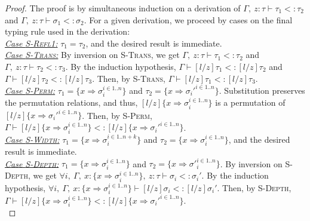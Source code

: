 \begin{proof} The proof is by simultaneous induction on a derivation of \mbox{$\Gamma,~z : \tau \vdash \tau_1 <:  \tau_2$} and \linebreak
    \mbox{$\Gamma,~z : \tau \vdash \sigma_1 <: \sigma_2$}. For a given derivation, we proceed by cases on the final typing rule used in the derivation:\\

\noindent\underline{\textit{Case \textsc{S-Refl1}:}} \mbox{$\tau_1 = \tau_2$}, and the desired result is immediate.\\

\noindent\underline{\textit{Case \textsc{S-Trans}:}} By inversion on \textsc{S-Trans}, we get \mbox{$\Gamma,~z : \tau \vdash \tau_1 <: \tau_2$} and \mbox{$\Gamma,~z : \tau \vdash \tau_2 <: \tau_3$}. By the induction hypothesis, \mbox{$\Gamma \vdash [l/z]\tau_1 <: [l/z]\tau_2$} and \mbox{$\Gamma \vdash [l/z]\tau_2 <: [l/z]\tau_3$}. Then, by\linebreak
\mbox{\textsc{S-Trans}}, \mbox{$\Gamma \vdash [l/z]\tau_1 <: [l/z]\tau_3$}.\\

\noindent\underline{\textit{Case \textsc{S-Perm}:}} \mbox{$\tau_1 = \{ x \Rightarrow \sigma_i^{i \in 1..n} \}$} and \mbox{$\tau_2 = \{ x \Rightarrow \sigma_i'^{i \in 1..n} \}$}. Substitution preserves the permutation relations, and thus, \mbox{$[l/z]\{ x \Rightarrow \sigma_i^{i \in 1..n} \}$} is a permutation of \mbox{$[l/z]\{ x \Rightarrow \sigma_i'^{i \in 1..n} \}$}. Then, by \textsc{S-Perm}, \mbox{$\Gamma \vdash [l/z]\{ x \Rightarrow \sigma_i^{i \in 1..n} \} <: [l/z]\{ x \Rightarrow \sigma_i'^{i \in 1..n} \}$}.\\

\noindent\underline{\textit{Case \textsc{S-Width}:}} \mbox{$\tau_1 = \{ x \Rightarrow \sigma_i^{i \in 1..n + k} \}$} and \mbox{$\tau_2 = \{ x \Rightarrow \sigma_i^{i \in 1..n} \}$}, and the desired result is immediate.\\

\noindent\underline{\textit{Case \textsc{S-Depth}:}} \mbox{$\tau_1 = \{ x \Rightarrow \sigma_i^{i \in 1..n} \}$} and \mbox{$\tau_2 = \{ x \Rightarrow {\sigma'}_i^{i \in 1..n} \}$}.  By inversion on \textsc{S-Depth}, \linebreak we get \mbox{$\forall i,~\Gamma,~x : \{ x \Rightarrow {\sigma}_i^{i \in 1..n} \},~z : \tau \vdash \sigma_i <: \sigma_i'$}. By the induction hypothesis, \linebreak
\mbox{$\forall i,~\Gamma,~x : \{ x \Rightarrow {\sigma}_i^{i \in 1..n} \} \vdash [l/z]\sigma_i <: [l/z]\sigma_i'$}. Then, by \textsc{S-Depth}, \linebreak
\mbox{$\Gamma \vdash [l/z]\{ x \Rightarrow \sigma_i^{i \in 1..n} \} <: [l/z]\{ x \Rightarrow \sigma_i'^{i \in 1..n} \}$}.\\



\end{proof}
